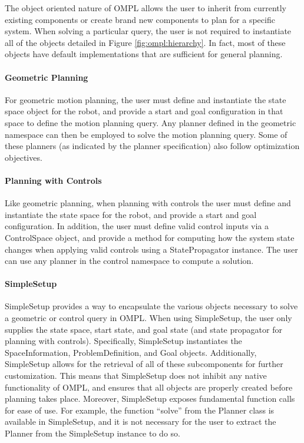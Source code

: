 The object oriented nature of OMPL allows the user to inherit from currently
existing components or create brand new components to plan for a specific
system.  When solving a particular query, the user is not required to
instantiate all of the objects detailed in Figure \ref{fig:ompl:hierarchy}.
In fact, most of these objects have default implementations that are
sufficient for general planning.

\paragraph {Geometric Planning}
For geometric motion planning, the user must define and instantiate the state
space object for the robot, and provide a start and goal configuration in that
space to define the motion planning query.  Any planner defined in the
geometric namespace can then be employed to solve the motion planning query.
Some of these planners (as indicated by the planner specification) also follow 
optimization objectives.

\paragraph {Planning with Controls}
Like geometric planning, when planning with controls the user must define and
instantiate the state space for the robot, and provide a start and goal
configuration.  In addition, the user must define valid control inputs via
a ControlSpace object, and provide a method for computing how the system state
changes when applying valid controls using a StatePropagator instance.  The
user can use any planner in the control namespace to compute a solution.

\paragraph {SimpleSetup}
SimpleSetup provides a way to encapsulate the various objects necessary to
solve a geometric or control query in OMPL.  When using SimpleSetup, the user
only supplies the state space, start state, and goal state (and state propagator
for planning with controls). Specifically, SimpleSetup instantiates the
SpaceInformation, ProblemDefinition, and Goal objects.  Additionally,
SimpleSetup allows for the retrieval of all of these subcomponents for further
customization.  This means that SimpleSetup does not inhibit any native
functionality of OMPL, and ensures that all objects are properly created before
planning takes place.  Moreover, SimpleSetup exposes fundamental function
calls for ease of use.  For example, the function ``solve'' from the Planner
class is available in SimpleSetup, and it is not necessary for the user to
extract the Planner from the SimpleSetup instance to do so.

